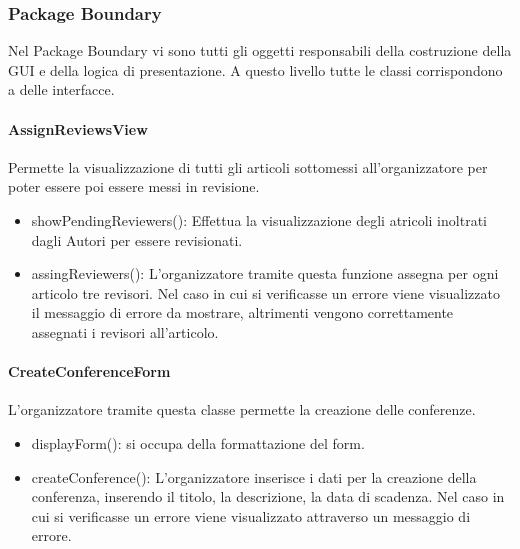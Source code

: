 \subsubsection{Package Boundary}
\label{sec:prg_package_boundary}

Nel Package Boundary vi sono tutti gli oggetti responsabili della costruzione della GUI e della logica di presentazione. A questo livello tutte le classi corrispondono a delle interfacce. 

\paragraph{AssignReviewsView}
Permette la visualizzazione di tutti gli articoli sottomessi all'organizzatore per poter essere poi essere messi in revisione.
\begin{itemize}
\item showPendingReviewers(): Effettua la visualizzazione degli atricoli inoltrati dagli Autori per essere revisionati.\\
\item assingReviewers(): L'organizzatore tramite questa funzione assegna per ogni articolo tre revisori. Nel caso in cui si verificasse un errore viene visualizzato il messaggio di errore da mostrare, altrimenti vengono correttamente assegnati i revisori all'articolo.\\
\end{itemize}


\paragraph{CreateConferenceForm}
L'organizzatore tramite questa classe permette la creazione delle conferenze.\\
\begin{itemize}
\item displayForm(): si occupa della formattazione del form.\\
\item createConference(): L'organizzatore inserisce i dati per la creazione della conferenza, inserendo il titolo, la descrizione, la data di scadenza. Nel caso in cui si verificasse un errore viene visualizzato attraverso un messaggio di errore.
\end{itemize}

